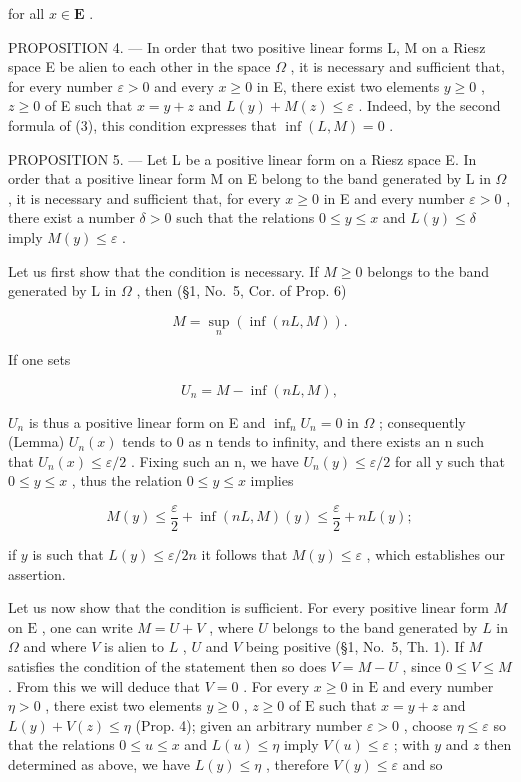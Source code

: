 for all \(x \in \mathbf{E}\) .

PROPOSITION 4. --- In order that two positive linear forms L, M on a Riesz space E be alien to each other in the space \(\Omega\) , it is necessary and sufficient that, for every number \(\varepsilon > 0\) and every \(x \geqslant 0\) in E, there exist two elements \(y \geqslant 0\) , \(z \geqslant 0\) of E such that \(x = y + z\) and \(L(y) + M(z) \leqslant \varepsilon\) . Indeed, by the second formula of (3), this condition expresses that \(\inf(L, M) = 0\) .

PROPOSITION 5. --- Let L be a positive linear form on a Riesz space E. In order that a positive linear form M on E belong to the band generated by L in \(\Omega\) , it is necessary and sufficient that, for every \(x \geqslant 0\) in E and every number \(\varepsilon > 0\) , there exist a number \(\delta > 0\) such that the relations \(0 \leqslant y \leqslant x\) and \(L(y) \leqslant \delta\) imply \(M(y) \leqslant \varepsilon\) .

Let us first show that the condition is necessary. If \(M \geqslant 0\) belongs to the band generated by L in \(\Omega\) , then (§1, No.~5, Cor. of Prop. 6)

\[
M = \sup _ {n} \left(\inf (n L, M)\right).
\]

If one sets

\[
U _ {n} = M - \inf (n L, M),
\]

\(U_{n}\) is thus a positive linear form on E and \(\inf_{n} U_{n} = 0\) in \(\Omega\) ; consequently (Lemma) \(U_{n}(x)\) tends to 0 as n tends to infinity, and there exists an n such that \(U_{n}(x) \leqslant \varepsilon / 2\) . Fixing such an n, we have \(U_{n}(y) \leqslant \varepsilon / 2\) for all y such that \(0 \leqslant y \leqslant x\) , thus the relation \(0 \leqslant y \leqslant x\) implies

\[
M (y) \leqslant \frac {\varepsilon}{2} + \inf (n L, M) (y) \leqslant \frac {\varepsilon}{2} + n L (y);
\]

if \(y\) is such that \(L(y) \leqslant \varepsilon / 2n\) it follows that \(M(y) \leqslant \varepsilon\) , which establishes our assertion.

Let us now show that the condition is sufficient. For every positive linear form \(M\) on \(\mathrm{E}\) , one can write \(M = U + V\) , where \(U\) belongs to the band generated by \(L\) in \(\Omega\) and where \(V\) is alien to \(L\) , \(U\) and \(V\) being positive (§1, No.~5, Th. 1). If \(M\) satisfies the condition of the statement then so does \(V = M - U\) , since \(0 \leqslant V \leqslant M\) . From this we will deduce that \(V = 0\) . For every \(x \geqslant 0\) in \(\mathrm{E}\) and every number \(\eta > 0\) , there exist two elements \(y \geqslant 0\) , \(z \geqslant 0\) of \(\mathrm{E}\) such that \(x = y + z\) and \(L(y) + V(z) \leqslant \eta\) (Prop. 4); given an arbitrary number \(\varepsilon > 0\) , choose \(\eta \leqslant \varepsilon\) so that the relations \(0 \leqslant u \leqslant x\) and \(L(u) \leqslant \eta\) imply \(V(u) \leqslant \varepsilon\) ; with \(y\) and \(z\) then determined as above, we have \(L(y) \leqslant \eta\) , therefore \(V(y) \leqslant \varepsilon\) and so

